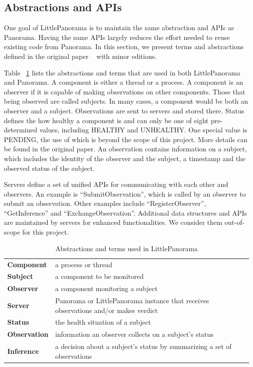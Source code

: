 \subsection{Abstractions and APIs}
One goal of LittlePanorama is to maintain the same abstraction and APIs as Panorama. Having the same APIs largely reduces the effort needed to reuse existing code from Panorama. In this section, we present terms and abstractions defined in the original paper ~\cite{huang2018capturing} with minor editions. 

Table ~\ref{tab:abs} lists the abstractions and terms that are used in both LittlePanorama and Panorama. A component is either a thread or a process. A component is an observer if it is capable of making observations on other components. Those that being observed are called subjects. In many cases, a component would be both an observer and a subject. Observations are sent to servers and stored there. 
Status defines the how healthy a component is and can only be one of eight pre-determined values, including HEALTHY and UNHEALTHY. One special value is PENDING, the use of which is beyond the scope of this project. More details can be found in the original paper. An observation contains information on a subject, which includes the identity of the observer and the subject, a timestamp and the observed status of the subject. 

Servers define a set of unified APIs for communicating with each other and observers. An example is ``SubmitObservation'', which is called by an observer to submit an observation. Other examples include ``RegisterObserver'', ``GetInference'' and ``ExchangeObservation''. Additional data structures and APIs are maintained by servers for enhanced functionalities. We consider them out-of-scope for this project. 

\begin{table}[!tb]
    \begin{tabular}{p{}p{}}%
    
    \toprule    
    \textbf{Component}   &    a process or thread  \\
    \textbf{Subject}   &    a component to be monitored  \\ 
    \textbf{Observer}   &    a component monitoring a subject  \\
    \textbf{Server}   &    Panorama or LittlePanorama instance that receives observations and/or makes verdict  \\
    \midrule
    \textbf{Status}   &    the health situation of a subject  \\
    \textbf{Observation}   &  information an observer collects on a subject's status  \\
    \textbf{Inference}  &    a decision about a subject's status by summarizing a set of observations\\
    \bottomrule
    \end{tabular}
    \vspace{0.5em}
    \caption{Abstractions and terms used in LittlePanorama}
    \label{tab:abs}
\end{table}


